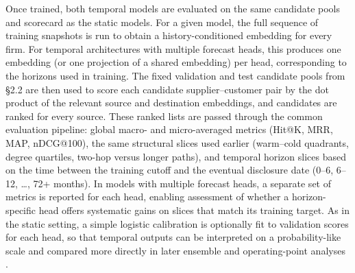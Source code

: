 Once trained, both temporal models are evaluated on the same candidate pools and scorecard as the static models. For a given model, the full sequence of training snapshots is run to obtain a history-conditioned embedding for every firm. For temporal architectures with multiple forecast heads, this produces one embedding (or one projection of a shared embedding) per head, corresponding to the horizons used in training. The fixed validation and test candidate pools from \S2.2 are then used to score each candidate supplier--customer pair by the dot product of the relevant source and destination embeddings, and candidates are ranked for every source. These ranked lists are passed through the common evaluation pipeline: global macro- and micro-averaged metrics (Hit@K, MRR, MAP, nDCG@100), the same structural slices used earlier (warm--cold quadrants, degree quartiles, two-hop versus longer paths), and temporal horizon slices based on the time between the training cutoff and the eventual disclosure date (0--6, 6--12, \dots, 72+ months). In models with multiple forecast heads, a separate set of metrics is reported for each head, enabling assessment of whether a horizon-specific head offers systematic gains on slices that match its training target. As in the static setting, a simple logistic calibration is optionally fit to validation scores for each head, so that temporal outputs can be interpreted on a probability-like scale and compared more directly in later ensemble and operating-point analyses \parencite{platt_probabilistic_1999}.

